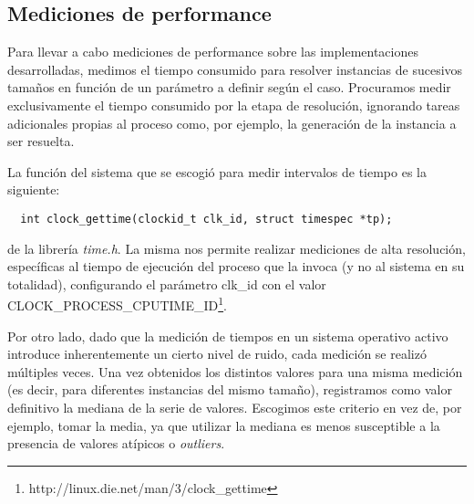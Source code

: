 

\subsection{Mediciones de performance}
\label{consideraciones-mediciones}

Para llevar a cabo mediciones de performance sobre las implementaciones desarrolladas, medimos el tiempo consumido para resolver instancias de sucesivos tamaños en función de un parámetro a definir según el caso. Procuramos medir exclusivamente el tiempo consumido por la etapa de resolución, ignorando tareas adicionales propias al proceso como, por ejemplo, la generación de la instancia a ser resuelta.

La función del sistema que se escogió para medir intervalos de tiempo es la siguiente:

\begin{verbatim}
  int clock_gettime(clockid_t clk_id, struct timespec *tp);
\end{verbatim}

de la librería \emph{time.h}. La misma nos permite realizar mediciones de alta resolución, específicas al tiempo de ejecución del proceso que la invoca (y no al sistema en su totalidad), configurando el parámetro clk\_id con el valor CLOCK\_PROCESS\_CPUTIME\_ID\footnote{http://linux.die.net/man/3/clock\_gettime}.

Por otro lado, dado que la medición de tiempos en un sistema operativo activo introduce inherentemente un cierto nivel de ruido, cada medición se realizó múltiples veces. Una vez obtenidos los distintos valores para una misma medición (es decir, para diferentes instancias del mismo tamaño), registramos como valor definitivo la mediana de la serie de valores. Escogimos este criterio en vez de, por ejemplo, tomar la media, ya que utilizar la mediana es menos susceptible a la presencia de valores atípicos o \emph{outliers}.
